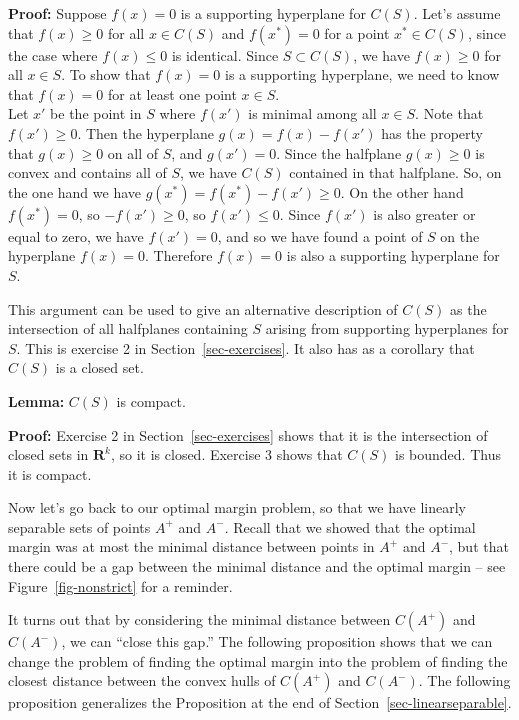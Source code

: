 \documentclass[
  11pt,
  letterpaper,
]{scrbook}
\theoremstyle{plain}
\theoremstyle{plain}
\theoremstyle{remark}
\begin{document}
\textbf{Proof:} Suppose \(f(x)=0\) is a supporting hyperplane for
\(C(S)\). Let's assume that \(f(x)\ge 0\) for all \(x\in C(S)\) and
\(f(x^{*})=0\) for a point \(x^{*}\in C(S)\), since the case where
\(f(x)\le 0\) is identical. Since \(S\subset C(S)\), we have
\(f(x)\ge 0\) for all \(x\in S\). To show that \(f(x)=0\) is a
supporting hyperplane, we need to know that \(f(x)=0\) for at least one
point \(x\in S\).\\
Let \(x'\) be the point in \(S\) where \(f(x')\) is minimal among all
\(x\in S\). Note that \(f(x')\ge 0\). Then the hyperplane
\(g(x) = f(x)-f(x')\) has the property that \(g(x)\ge 0\) on all of
\(S\), and \(g(x')=0\). Since the halfplane \(g(x)\ge 0\) is convex and
contains all of \(S\), we have \(C(S)\) contained in that halfplane. So,
on the one hand we have \(g(x^{*})=f(x^{*})-f(x')\ge 0\). On the other
hand \(f(x^{*})=0\), so \(-f(x')\ge 0\), so \(f(x')\le 0\). Since
\(f(x')\) is also greater or equal to zero, we have \(f(x')=0\), and so
we have found a point of \(S\) on the hyperplane \(f(x)=0\). Therefore
\(f(x)=0\) is also a supporting hyperplane for \(S\).

This argument can be used to give an alternative description of \(C(S)\)
as the intersection of all halfplanes containing \(S\) arising from
supporting hyperplanes for \(S\). This is exercise 2 in
Section~\ref{sec-exercises}. It also has as a corollary that \(C(S)\) is
a closed set.

\textbf{Lemma:} \(C(S)\) is compact.

\textbf{Proof:} Exercise 2 in Section~\ref{sec-exercises} shows that it
is the intersection of closed sets in \(\mathbf{R}^{k}\), so it is
closed. Exercise 3 shows that \(C(S)\) is bounded. Thus it is compact.

Now let's go back to our optimal margin problem, so that we have
linearly separable sets of points \(A^{+}\) and \(A^{-}\). Recall that
we showed that the optimal margin was at most the minimal distance
between points in \(A^{+}\) and \(A^{-}\), but that there could be a gap
between the minimal distance and the optimal margin -- see
Figure~\ref{fig-nonstrict} for a reminder.

It turns out that by considering the minimal distance between
\(C(A^{+})\) and \(C(A^{-})\), we can ``close this gap.'' The following
proposition shows that we can change the problem of finding the optimal
margin into the problem of finding the closest distance between the
convex hulls of \(C(A^{+})\) and \(C(A^{-})\). The following proposition
generalizes the Proposition at the end of
Section~\ref{sec-linearseparable}.
\end{document}

